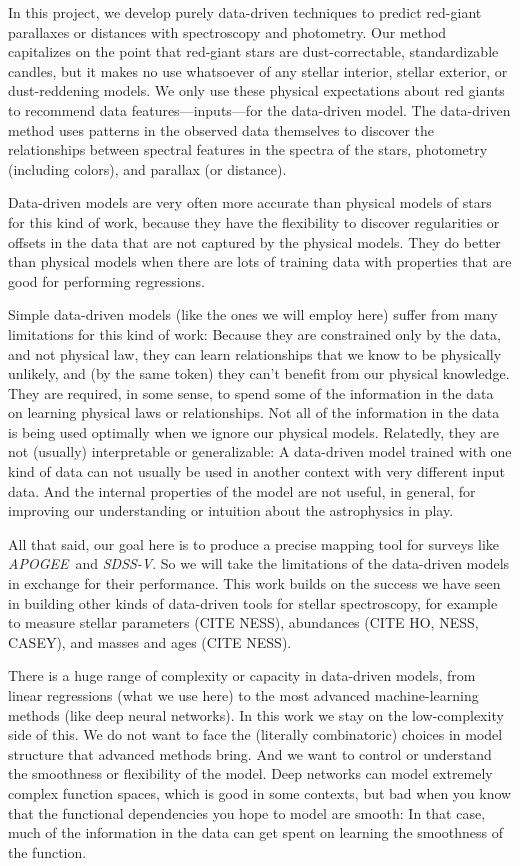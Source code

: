 \documentclass[modern]{aastex62}
\newcommand{\acronym}[1]{{\small{#1}}}
\newcommand{\project}[1]{\textsl{#1}}
\newcommand{\apogee}{\project{\acronym{APOGEE}}}
\newcommand{\sdssv}{\project{\acronym{SDSS-V}}}
\begin{document}
In this project, we develop purely data-driven techniques to predict
red-giant parallaxes or distances with spectroscopy and photometry.
Our method capitalizes on the point that red-giant stars are dust-correctable,
standardizable candles, but it makes no use whatsoever of any stellar interior,
stellar exterior, or dust-reddening models.
We only use these physical expectations about red giants to recommend
data features---inputs---for the data-driven model.
The data-driven method uses patterns in the observed data themselves
to discover the relationships between spectral features in the spectra of the stars,
photometry (including colors), and parallax (or distance).

Data-driven models are very often more accurate than physical models of stars
for this kind of work, because they have the flexibility to discover
regularities or offsets in the data that are not captured by the physical
models.
They do better than physical models when there are lots of training data
with properties that are good for performing regressions.

Simple data-driven models (like the ones we will employ here)
suffer from many limitations for this kind of work:
Because they are constrained only by the data, and not physical law,
they can learn relationships that we know
to be physically unlikely, and (by the same token) they can't benefit from our
physical knowledge.
They are required, in some sense, to spend some of the information in the data on
learning physical laws or relationships.
Not all of the information in the data is being used
optimally when we ignore our physical models.
Relatedly, they are not (usually) interpretable or generalizable:
A data-driven model trained with one kind of data can not usually be used in another
context with very different input data.
And the internal properties of the model are not useful, in general, for improving
our understanding or intuition about the astrophysics in play.

All that said, our goal here is to produce a precise mapping tool for surveys
like \apogee\ and \sdssv.
So we will take the limitations of the data-driven models in exchange for their
performance.
This work builds on the success we have seen in building other kinds of
data-driven tools for  stellar spectroscopy, for example to measure stellar
parameters (CITE NESS), abundances (CITE HO, NESS, CASEY), and masses and ages (CITE NESS).

There is a huge range of complexity or capacity in data-driven
models, from linear regressions (what we use here) to the most advanced machine-learning
methods (like deep neural networks).
In this work we stay on the low-complexity side of this.
We do not want to face the (literally combinatoric) choices in model structure that
advanced methods bring.
And we want to control or understand the smoothness or flexibility of the model.
Deep networks can model extremely complex function spaces, which is good in some
contexts, but bad when you know that the functional dependencies you hope to
model are smooth:
In that case, much of the information in the data can get spent on learning the
smoothness of the function.
\end{document}
